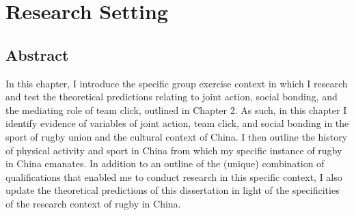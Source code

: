 
\chapter{\label{researchSetting}Research Setting}


\minitoc


\section{Abstract}
In this chapter, I introduce the specific group exercise context in which I research and test the theoretical predictions relating to joint action, social bonding, and the mediating role of team click, outlined in Chapter 2.   As such, in this chapter I identify evidence of variables of joint action, team click, and social bonding in the sport of rugby union and the cultural context of China. I then outline the history of physical activity and sport in China from which my specific instance of rugby in China emanates.  In addition to an outline of the (unique) combination of qualifications that enabled me to conduct research in this specific context, I also update the theoretical predictions of this dissertation in light of the specificities of the research context of rugby in China.






